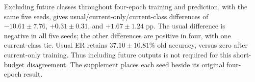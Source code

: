Excluding future classes throughout four-epoch training and prediction,
with the same five seeds, gives usual/current-only/current-class
differences of $-10.61\pm7.76$, $+0.31\pm0.31$, and $+1.67\pm1.24$ pp.
The usual difference is negative in all five seeds; the other differences
are positive in four, with one current-class tie. Usual ER retains
$37.10\pm10.81\%$ old accuracy, versus zero after current-only training.
Thus including future outputs is not required for this short-budget
disagreement. The supplement places each seed beside its original
four-epoch result.
